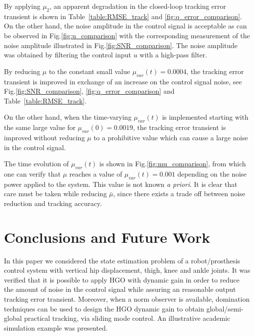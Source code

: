 \documentclass[letterpaper, 10 pt, journal, twocolumn]{IEEEtran}  %
\theoremstyle{plain}
\theoremstyle{definition}
\theoremstyle{remark}
\begin{document}
%
By applying $\mu_{2}$, an apparent degradation in the closed-loop tracking error transient is shown in Table~\ref{table:RMSE_track} and \ref{fig:q_error_comparison}. On the other hand, the noise amplitude in the control signal is acceptable as can be observed in Fig.\ref{fig:u_comparison} with the corresponding measurement of the noise amplitude illustrated in Fig.\ref{fig:SNR_comparison}. The noise amplitude was obtained by filtering the control input $u$ with a high-pass filter.
%

%
By reducing $\mu$ to the constant small value $\mu_{var}(t) = 0.0004$, the  tracking error transient is improved in exchange of an increase on the control signal noise, see  Fig.\ref{fig:SNR_comparison}, \ref{fig:q_error_comparison} and Table~\ref{table:RMSE_track}.
%

%
On the other hand, when the time-varying $\mu_{var}(t)$ is implemented starting with the same large value for
$\mu_{var}(0) = 0.0019$, the tracking error transient is improved without reducing $\mu$ to a prohibitive value which can cause a large noise in the control signal. 
%

%
The time evolution of $\mu_{var}(t)$ is shown in Fig.\ref{fig:mu_comparison}, from which one can verify
that $\mu$ reaches a value of $\mu_{var}(t)=0.001$ depending on the noise power applied  to the system. 
This value is not known {\em a priori}. It is clear that care must be taken while reducing $\bar{\mu}$, since there exists a trade off between noise reduction and tracking accuracy.
%
%


\section{Conclusions and Future Work}
\label{sec:Conclusions}

In this paper we considered the state estimation problem of a robot/prosthesis control system with vertical hip displacement, thigh, knee and ankle joints.  It was verified that it is possible to apply HGO with dynamic gain in order to reduce the amount of noise in the control signal while assuring an reasonable output tracking error transient. Moreover, when a norm observer is available, domination techniques can be used to design the HGO dynamic gain to obtain global/semi-global practical tracking, via sliding mode control. An illustrative academic simulation example was presented.
\end{document}
